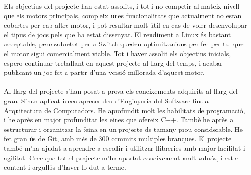 Els objectius del projecte han estat assolits, i tot i no competir al mateix nivell que els motors principals, compleix unes funcionalitats que actualment no estan cobertes per cap altre motor, i pot resultar molt útil en cas de voler desenvolupar el tipus de jocs pels que ha estat dissenyat.
El rendiment a Linux és bastant acceptable, però sobretot per a Switch queden optimitzacions per fer per tal que el motor sigui comercialment viable.
Tot i haver assolit els objectius inicials, espero continuar treballant en aquest projecte al llarg del temps, i acabar publicant un joc fet a partir d'una versió millorada d'aquest motor.
\\
\\
Al llarg del projecte s'han posat a prova els coneixements adquirits al llarg del grau. S'han aplicat idees apreses des d'Enginyeria del Software fins a Arquitectura de Computadors.
He aprofundit molt les habilitats de programació, i he après en major profunditat les eines que ofereix C++. Tambè he après a estructurar i organitzar la feina en un projecte de tamany prou considerable.
He fet gran ús de Git, amb més de 300 commits multiples branques. El projecte també m'ha ajudat a aprendre a escollir i utilitzar llibreries amb major facilitat i agilitat.
Crec que tot el projecte m'ha aportat coneixement molt valuós, i estic content i orgullós d'haver-lo dut a terme.

